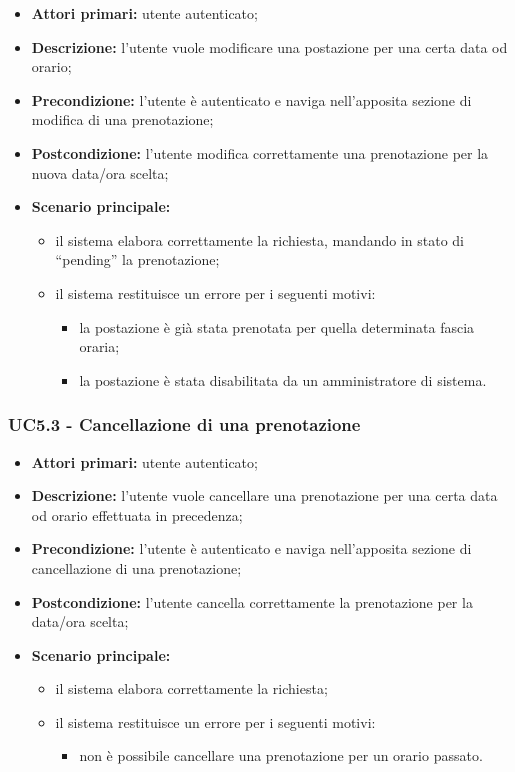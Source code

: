 \begin{itemize}
\item \textbf{Attori primari:} utente autenticato;
\item \textbf{Descrizione:} l’utente vuole modificare una postazione per una certa data od orario;
\item \textbf{Precondizione:} l’utente è autenticato e naviga nell’apposita sezione di modifica di una prenotazione;
\item \textbf{Postcondizione:} l’utente modifica correttamente una prenotazione per la nuova data/ora scelta;
\item \textbf{Scenario principale:} 
	\begin{itemize}
		\item il sistema elabora correttamente la richiesta, mandando in stato di “pending” la prenotazione;
		\item il sistema restituisce un errore per i seguenti motivi:
		\begin{itemize}
			\item la postazione è già stata prenotata per quella determinata fascia oraria;
			\item la postazione è stata disabilitata da un amministratore di sistema.	
		\end{itemize}
	\end{itemize}
\end{itemize}

\subsubsection{UC5.3 - Cancellazione di una prenotazione}

\begin{itemize}
\item \textbf{Attori primari:} utente autenticato;
\item \textbf{Descrizione:} l’utente vuole cancellare una prenotazione per una certa data od orario effettuata in precedenza;
\item \textbf{Precondizione:} l’utente è autenticato e naviga nell’apposita sezione di cancellazione di una prenotazione;
\item \textbf{Postcondizione:} l’utente cancella correttamente la prenotazione per la data/ora scelta;
\item \textbf{Scenario principale:} 
	\begin{itemize}
		\item il sistema elabora correttamente la richiesta;
		\item il sistema restituisce un errore per i seguenti motivi:
		\begin{itemize}
			\item non è possibile cancellare una prenotazione per un orario passato.
		\end{itemize}
	\end{itemize}
\end{itemize}

